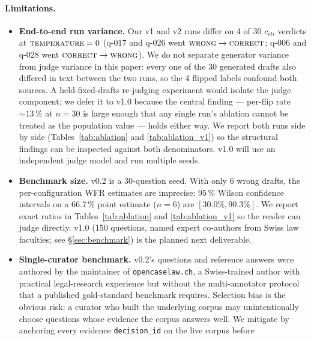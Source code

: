 \documentclass[11pt,a4paper]{article}
\begin{document}
\paragraph{Limitations.}
\begin{itemize}
  \item \textbf{End-to-end run variance.}  Our v1 and v2
        runs differ on 4 of 30 $c_{eli}$ verdicts at
        $\textsc{temperature}=0$ (q-017 and q-026 went
        $\textsc{wrong}\rightarrow \textsc{correct}$; q-006
        and q-028 went $\textsc{correct}\rightarrow
        \textsc{wrong}$).  We do not separate generator
        variance from judge variance in this paper: every one
        of the 30 generated drafts also differed in text
        between the two runs, so the 4 flipped labels confound
        both sources.  A held-fixed-drafts re-judging
        experiment would isolate the judge component; we
        defer it to v1.0 because the central finding ---
        per-flip rate $\sim 13\,\%$ at $n=30$ is large enough
        that any single run's ablation cannot be treated as
        the population value --- holds either way.  We report
        both runs side by side (Tables~\ref{tab:ablation} and
        \ref{tab:ablation_v1}) so the structural findings can
        be inspected against both denominators.  v1.0 will
        use an independent judge model and run multiple seeds.
  \item \textbf{Benchmark size.}  v0.2 is a 30-question seed.
        With only 6 wrong drafts, the per-configuration WFR
        estimates are imprecise: 95\,\% Wilson confidence
        intervals on a 66.7\,\% point estimate ($n=6$) are
        $[30.0\%, 90.3\%]$.  We report exact ratios in
        Tables~\ref{tab:ablation} and \ref{tab:ablation_v1}
        so the reader can judge directly.  v1.0 (150 questions,
        named expert co-authors from Swiss law faculties; see
        \S\ref{sec:benchmark}) is the planned next deliverable.
  \item \textbf{Single-curator benchmark.}  v0.2's questions and
        reference answers were authored by the maintainer of
        \texttt{opencaselaw.ch}, a Swiss-trained author with
        practical legal-research experience but without the
        multi-annotator protocol that a published gold-standard
        benchmark requires.  Selection bias is the obvious risk:
        a curator who built the underlying corpus may
        unintentionally choose questions whose evidence the
        corpus answers well.  We mitigate by anchoring every
        evidence \texttt{decision\_id} on the live corpus before

\end{itemize}
\end{document}
